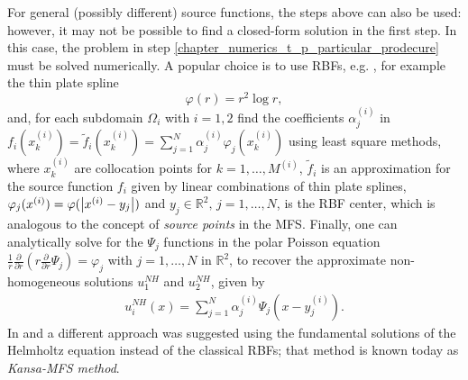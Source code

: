 \begin{remark}
    For general (possibly different) source functions, the steps above can also be used: however, it may not be possible to find a closed-form solution in the first step. In this case, the problem in step \ref{chapter_numerics_t_p_particular_prodecure} must be solved numerically. A popular choice is to use \acp{RBF}, e.g. \cite{golberg1996improved}, for example the thin plate spline
    \[
        \varphi(r) = r^2 \log r,
    \]
    and, for each subdomain \(\Omega_i\) with \(i=1,2\) find the coefficients \(\alpha_j^{(i)}\) in \(f_i(x_k^{(i)}) =\tilde{f}_i(x_k^{(i)}) = \sum_{j=1}^{N} \alpha_j^{(i)} \varphi_j(x_k^{(i)})\) using least square methods, where \(x_k^{(i)}\) are collocation points for \(k=1,\dots,M^{(i)}\), \(\tilde{f}_i\) is an approximation for the source function \(f_i\) given by linear combinations of thin plate splines, \(\varphi_j(x^{(i)}) = \varphi(\abs{x^{(i)}-y_j})\) and \(y_j \in \mathbb{R}^2, \, j =1,\dots, N\), is the \ac{RBF} center, which is analogous to the concept of \textit{source points} in the \ac{MFS}. Finally, one can analytically solve for the \(\Psi_j\) functions in the polar Poisson equation \(\frac{1}{r}\frac{\partial}{\partial r}\left(r \frac{\partial}{\partial r}\Psi_j\right)  = \varphi_j\) with \(j=1,\dots,N\) in \(\mathbb{R}^2\), to recover the approximate non-homogeneous solutions \(u_1^{NH}\) and \(u_2^{NH}\), given by
    \begin{align*}
        u_i^{NH}(x) = \sum_{j=1}^{N} \alpha_j^{(i)} \Psi_j(x-y_j^{(i)}).
    \end{align*}
    In \cite{alves2005new} and \cite{alves2021domain} a different approach was suggested using the fundamental solutions of the Helmholtz equation instead of the classical \acp{RBF}; that method is known today as \textit{Kansa-MFS method}.
\end{remark}

